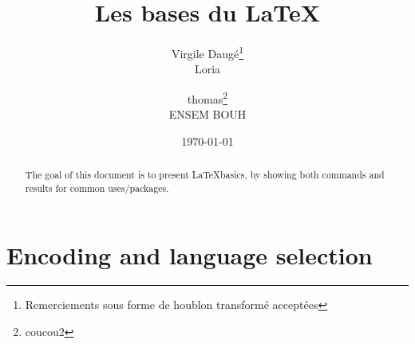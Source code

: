 \documentclass[a4paper,12pt]{article}
\begin{document}
\title{Les bases du \LaTeX}
\author{Virgile Daugé\thanks{Remerciements sous forme de houblon transformé acceptées}\\Loria \and thomas\thanks{coucou2}\\ENSEM BOUH}%
\date{\today}

\maketitle
\begin{abstract}
  The goal of this document is to present \LaTeX basics, by showing both commands and results for common uses/packages.
\end{abstract}
\tableofcontents
%
%


\newpage
\section{Encoding and language selection}
\end{document}
